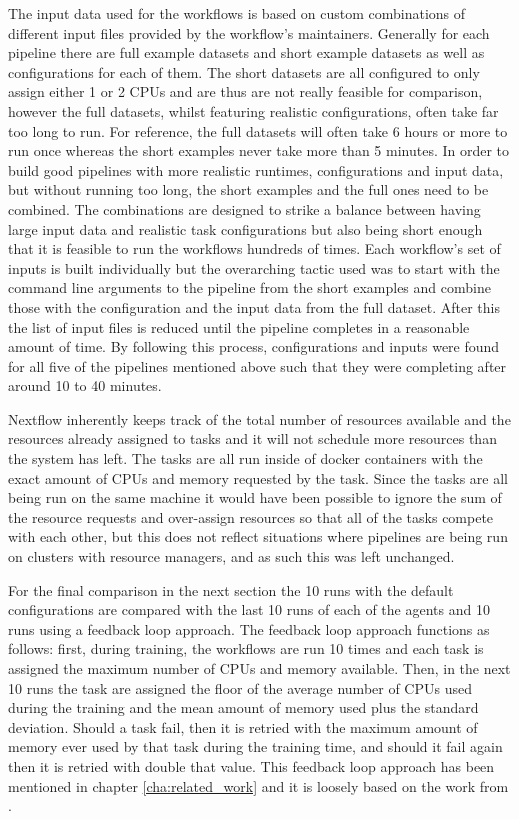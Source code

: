The input data used for the workflows is based on custom combinations of different input files provided by the workflow's maintainers. Generally for each pipeline there are full example datasets and short example datasets as well as configurations for each of them. The short datasets are all configured to only assign either 1 or 2 CPUs and are thus are not really feasible for comparison, however the full datasets, whilst featuring realistic configurations, often take far too long to run. For reference, the full datasets will often take 6 hours or more to run once whereas the short examples never take more than 5 minutes. In order to build good pipelines with more realistic runtimes, configurations and input data, but without running too long, the short examples and the full ones need to be combined. The combinations are designed to strike a balance between having large input data and realistic task configurations but also being short enough that it is feasible to run the workflows hundreds of times. Each workflow’s set of inputs is built individually but the overarching tactic used was to start with the command line arguments to the pipeline from the short examples and combine those with the configuration and the input data from the full dataset. After this the list of input files is reduced until the pipeline completes in a reasonable amount of time. By following this process, configurations and inputs were found for all five of the pipelines mentioned above such that they were completing after around 10 to 40 minutes.  

Nextflow inherently keeps track of the total number of resources available and the resources already assigned to tasks and it will not schedule more resources than the system has left. The tasks are all run inside of docker containers with the exact amount of CPUs and memory requested by the task. Since the tasks are all being run on the same machine it would have been possible to ignore the sum of the resource requests and over-assign resources so that all of the tasks compete with each other, but this does not reflect situations where pipelines are being run on clusters with resource managers, and as such this was left unchanged.

For the final comparison in the next section the 10 runs with the default configurations are compared with the last 10 runs of each of the agents and 10 runs using a feedback loop approach. The feedback loop approach functions as follows: first, during training, the workflows are run 10 times and each task is assigned the maximum number of CPUs and memory available. Then, in the next 10 runs the task are assigned the floor of the average number of CPUs used during the training and the mean amount of memory used plus the standard deviation. Should a task fail, then it is retried with the maximum amount of memory ever used by that task during the training time, and should it fail again then it is retried with double that value. This feedback loop approach has been mentioned in chapter \ref{cha:related_work} and it is loosely based on the work from \cite{tovarjob,FeedbackBasedAllocation}.



